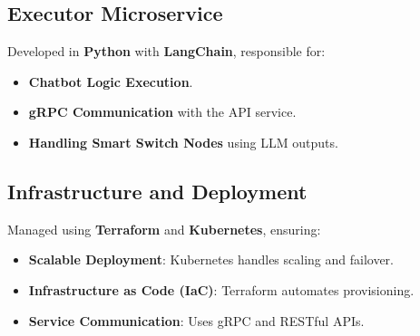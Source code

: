 \subsection{Executor Microservice}
Developed in \textbf{Python} with \textbf{LangChain}, responsible for:
\begin{itemize}
\item \textbf{Chatbot Logic Execution}.
\item \textbf{gRPC Communication} with the API service.
\item \textbf{Handling Smart Switch Nodes} using LLM outputs.
\end{itemize}

\subsection{Infrastructure and Deployment}
Managed using \textbf{Terraform} and \textbf{Kubernetes}, ensuring:
\begin{itemize}
\item \textbf{Scalable Deployment}: Kubernetes handles scaling and failover.
\item \textbf{Infrastructure as Code (IaC)}: Terraform automates provisioning.
\item \textbf{Service Communication}: Uses gRPC and RESTful APIs.
\end{itemize}